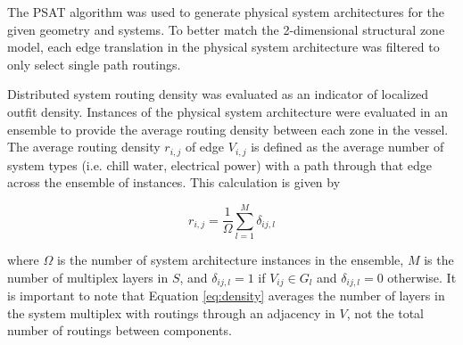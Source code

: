 \documentclass[preprint,12pt]{elsarticle}
\begin{document}


The PSAT algorithm was used to generate physical system architectures for the given geometry and systems. To better match the 2-dimensional structural zone model, each edge translation in the physical system architecture was filtered to only select single path routings. 

Distributed system routing density was evaluated as an indicator of localized outfit density. Instances of the physical system architecture were evaluated in an ensemble to provide the average routing density between each zone in the vessel. The average routing density $r_{i,j}$ of edge $V_{i,j}$ is defined as the average number of system types (i.e. chill water, electrical power) with a path through that edge across the ensemble of instances. This calculation is given by

\begin{equation}
r_{i,j}=\dfrac{1}{\Omega}\sum_{l=1}^{M}\delta_{ij,l}
\label{eq:density}
\end{equation}

\noindent where $\Omega$ is the number of system architecture instances in the ensemble, $M$ is the number of multiplex layers in $S$, and $\delta_{ij,l}=1$ if $V_{ij} \in G_l$ and $\delta_{ij,l}=0$ otherwise. It is important to note that Equation \ref{eq:density} averages the number of layers in the system multiplex with routings through an adjacency in $V$, not the total number of routings between components.
\end{document}
